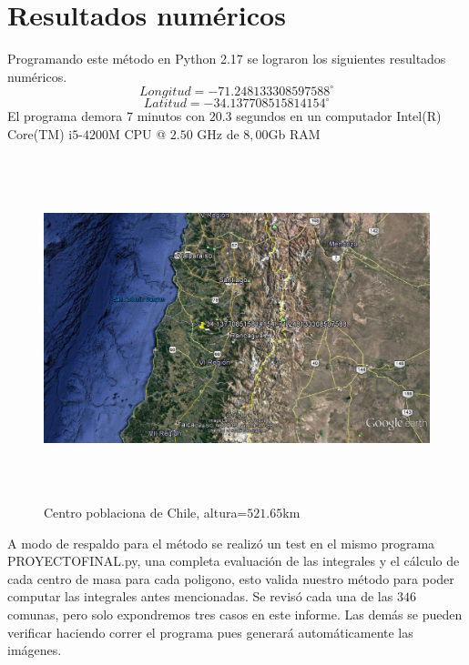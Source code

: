 \documentclass[20pt]{report}
\begin{document}
\begin{itemize}
\label{cap.introduccion}\section{Resultados num\'ericos} 
Programando este m\'etodo en Python 2.17 se lograron los siguientes resultados num\'ericos. 
\[Longitud=-71.248133308597588 ^\circ \]
\[Latitud=-34.137708515814154^\circ \]
El programa demora $7$ minutos con $20.3$ segundos en un computador Intel(R) Core(TM) i$5$-$4200$M CPU @ $2.50$ GHz de $8,00$Gb RAM
\begin{figure}[H]
\begin{center}
\includegraphics[width=15cm, height=10cm]{centro2.png}
\vspace{-0.5cm} %
\caption{Centro poblaciona de Chile, altura=$521.65$km}
\label{Label para referencia}
\end{center}
\end{figure}
\pagebreak
A modo de  respaldo para el m\'etodo se realiz\'o un test en el mismo programa PROYECTOFINAL.py, una completa evaluaci\'on de las integrales y el c\'alculo de cada centro de masa para cada poligono, esto valida nuestro m\'etodo para poder computar las integrales antes mencionadas. Se revis\'o cada una de las $346$ comunas, pero solo expondremos tres casos en este informe. Las dem\'as se pueden verificar haciendo correr el programa pues generar\'a autom\'aticamente las im\'agenes. 
\begin{figure}[H]
\begin{center}

\end{center}
\end{figure}
\end{itemize}
\end{document}
